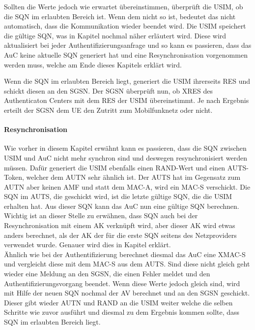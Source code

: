  Sollten die Werte jedoch wie erwartet übereinstimmen, überprüft die USIM, ob die SQN im erlaubten
 Bereich ist. Wenn dem nicht so ist, bedeutet das nicht automatisch, dass die Kommunikation wieder
 beendet wird. Die USIM speichert die gültige SQN, was in Kapitel 
 nochmal näher erläutert wird. Diese wird aktualisiert bei jeder Authentifizierungsanfrage und so kann
 es passieren, dass das AuC keine aktuelle SQN generiert hat und eine Resynchronisation vorgenommen
 werden muss, welche am Ende dieses Kapitels erklärt wird.
 
 Wenn die SQN im erlaubten Bereich liegt, generiert die USIM ihrerseits RES und schickt diesen an
 den SGSN. Der SGSN überprüft nun, ob XRES des Authenticaton Centers mit dem RES der USIM
 übereinstimmt. Je nach Ergebnis erteilt der SGSN dem \ac{UE} den Zutritt zum Mobilfunknetz oder
 nicht.
 
 \paragraph{Resynchronisation}
 \label{par:resynchronisation}
  Wie vorher in diesem Kapitel erwähnt kann es passieren, dass die SQN zwischen USIM und AuC
  nicht mehr synchron sind und deswegen resynchronisiert werden müssen. Dafür generiert die
  USIM ebenfalls einen RAND-Wert und einen AUTS-Token, welcher dem AUTN sehr ähnlich ist.
  Der AUTS hat im Gegensatz zum AUTN aber keinen AMF und statt dem MAC-A, wird ein MAC-S
  verschickt. Die SQN im AUTS, die geschickt wird, ist die letzte gültige SQN, die die USIM erhalten
  hat. Aus dieser SQN kann das AuC nun eine gültige SQN berechnen. Wichtig ist an dieser
  Stelle zu erwähnen, dass SQN auch bei der Resynchronisation mit einem AK verknüpft wird,
  aber dieser AK wird etwas anders berechnet, als der AK der für die erste SQN seitens des
  Netzproviders verwendet wurde. Genauer wird dies in Kapitel 
  erklärt.\\
  Ähnlich wie bei der Authentifizierung berechnet diesmal das AuC eine XMAC-S und vergleicht
  diese mit dem MAC-S aus dem AUTS. Sind diese nicht gleich geht wieder eine Meldung an den
  SGSN, die einen Fehler meldet und den Authentifizierungsvorgang beendet. Wenn diese Werte
  jedoch gleich sind, wird mit Hilfe der neuen SQN nochmal der AV berechnet und an den SGSN
  geschickt. Dieser gibt wieder AUTN und RAND an die USIM weiter welche die selben Schritte
  wie zuvor ausführt und diesmal zu dem Ergebnis kommen sollte, dass SQN im erlaubten
  Bereich liegt.
  
